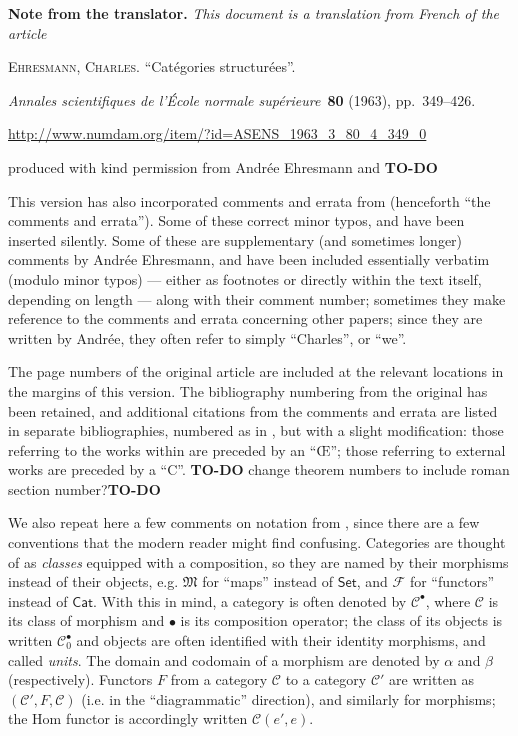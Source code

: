 \documentclass[a4paper,fleqn]{article}
\title{\sc{Structured categories}}
\author{Charles Ehresmann}
\date{1963}
\newcommand{\origcit}{%
  \textsc{Ehresmann, Charles.}
  ``Catégories structurées''.
  \par\emph{Annales scientifiques de l'École normale supérieure}~\textbf{80} (1963), pp.~349--426.
  \par\url{http://www.numdam.org/item/?id=ASENS_1963_3_80_4_349_0}
}
\newenvironment{translator}[1]
  {\phantomsection\par\medskip\noindent\small\textbf{#1.}\itshape}
  {\par\medskip}
\theoremstyle{plain}
\theoremstyle{definition}
\newcommand{\todo}{{\color{purple}\textbf{TO-DO }}}
\newcommand{\CC}{\mathcal{C}}
\newcommand{\MM}{\mathfrak{M}}
\newcommand{\FF}{\mathcal{F}}
\begin{document}
\maketitle

  \begin{translator}{Note from the translator}
    This document is a translation from French of the article

    \medskip
    {\normalfont\origcit}

    \medskip
    {\noindent}produced with kind permission from Andrée Ehresmann and \todo

    \medskip

    This version has also incorporated comments and errata from \cite[Comments on Part III-1, p.~342--363]{coll} (henceforth ``the comments and errata'').
    Some of these correct minor typos, and have been inserted silently.
    Some of these are supplementary (and sometimes longer) comments by Andrée Ehresmann, and have been included essentially verbatim (modulo minor typos) --- either as footnotes or directly within the text itself, depending on length --- along with their comment number;
    sometimes they make reference to the comments and errata concerning other papers;
    since they are written by Andrée, they often refer to simply ``Charles'', or ``we''.

    The page numbers of the original article are included at the relevant locations in the margins of this version.
    The bibliography numbering from the original has been retained, and additional citations from the comments and errata are listed in separate bibliographies, numbered as in \cite{coll}, but with a slight modification: those referring to the works within \cite{coll} are preceded by an ``Œ''; those referring to external works are preceded by a ``C''.
    \todo{change theorem numbers to include roman section number?}\todo

    \medskip

    We also repeat here a few comments on notation from \cite[Comments on Part III-1, p.~337--338]{coll}, since there are a few conventions that the modern reader might find confusing.
    Categories are thought of as \emph{classes} equipped with a composition, so they are named by their morphisms instead of their objects, e.g. $\MM$ for ``maps'' instead of $\mathsf{Set}$, and $\FF$ for ``functors'' instead of $\mathsf{Cat}$.
    With this in mind, a category is often denoted by $\CC^\bullet$, where $\CC$ is its class of morphism and $\bullet$ is its composition operator; the class of its objects is written $\CC_0^\bullet$ and objects are often identified with their identity morphisms, and called \emph{units}.
    The domain and codomain of a morphism are denoted by $\alpha$ and $\beta$ (respectively).
    Functors $F$ from a category $\CC$ to a category $\CC'$ are written as $(\CC',F,\CC)$ (i.e. in the ``diagrammatic'' direction), and similarly for morphisms; the Hom functor is accordingly written $\CC(e',e)$.


\end{translator}
\end{document}
